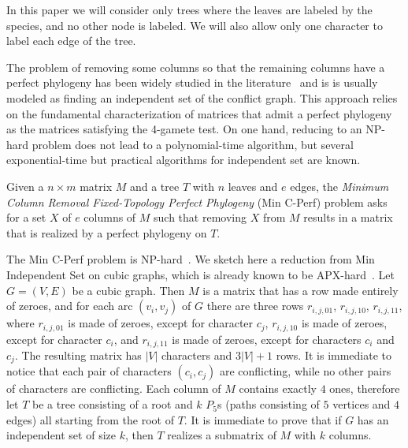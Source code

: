 In this paper we will consider only trees where the leaves are labeled
by the species, and no other node is labeled.
We will also allow only one character to label each edge of the tree.





The problem of removing some columns so that the remaining columns
have a perfect phylogeny has been widely studied in the
literature~\cite{rens_snv-ppilp:_2015} and is is usually  modeled as
finding an independent set of the conflict graph.
This approach relies on the fundamental characterization of matrices
that admit a perfect phylogeny as the matrices satisfying the 4-gamete test.
On one hand, reducing to an NP-hard problem does not lead to a
polynomial-time algorithm, but several exponential-time but practical
algorithms for independent set are known.

\begin{definition}
\label{definition:perfect-problem}
Given a $n\times m$ matrix $M$ and a tree $T$ with $n$ leaves and $e$
edges, the
\emph{Minimum Column Removal Fixed-Topology Perfect Phylogeny} (Min
C-Perf) problem asks for a set $X$ of $e$ columns of $M$ such
that removing $X$ from $M$ results in a matrix that is realized by a
perfect phylogeny on $T$.
\end{definition}


The Min C-Perf problem is NP-hard~\cite{karp_reducibility_1972}.
We sketch here a reduction from Min Independent Set on cubic graphs,
which is already known to be APX-hard~\cite{alimonti_apx-completeness_2000}.
Let $G=(V,E)$ be a cubic graph.
Then $M$ is a matrix that has a row made entirely of zeroes, and for
each arc $(v_{i}, v_{j})$ of $G$ there are three rows $r_{i,j,01}$,
$r_{i,j,10}$, $r_{i,j,11}$, where  $r_{i,j,01}$ is made of zeroes,
except for character $c_{j}$,
$r_{i,j,10}$  is made of zeroes,
except for character $c_{i}$, and $r_{i,j,11}$  is made of zeroes,
except for characters $c_{i}$ and $c_{j}$.
The resulting matrix has $|V|$ characters and $3|V|+1$ rows.
It is immediate to notice that each pair of characters $(c_{i},
c_{j})$ are conflicting, while no other pairs of characters are conflicting.
Each column of $M$ contains exactly $4$ ones, therefore let $T$ be a tree
consisting of a root and $k$ $P_{5}$s (paths consisting of $5$
vertices and $4$ edges) all starting from the root of $T$.
It is immediate to prove that if $G$ has an independent set of size
$k$, then $T$ realizes a submatrix of $M$ with $k$ columns.



